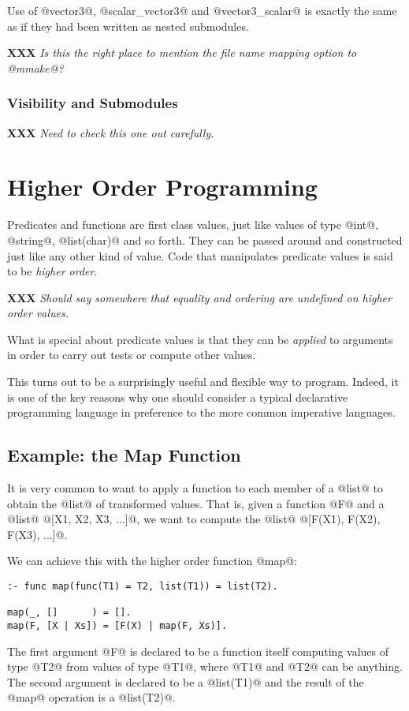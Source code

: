 \documentclass[a4paper,11pt,notitlepage,onecolumn]{article}
\newcommand{\XXX}[1]%
{{\small\textbf{XXX} \emph{#1}}}
\begin{document}
Use of @vector3@, @scalar_vector3@ and @vector3_scalar@ is exactly the
same as if they had been written as nested submodules.

\XXX{Is this the right place to mention the file name mapping option to
@mmake@?}

\subsubsection{Visibility and Submodules}

\XXX{Need to check this one out carefully.}



\section{Higher Order Programming}

Predicates and functions are first class values, just like values of
type @int@, @string@, @list(char)@ and so forth.  They can be
passed around and constructed just like any other kind of value.  Code
that manipulates predicate values is said to be \emph{higher order}.

\XXX{Should say somewhere that equality and ordering are undefined on
higher order values.}

What is special about predicate values is that they can be
\emph{applied} to arguments in order to carry out tests or compute other
values.

This turns out to be a surprisingly useful and flexible way to program.
Indeed, it is one of the key reasons why one should consider a typical
declarative programming language in preference to the more common
imperative languages.

\subsection{Example: the Map Function}

It is very common to want to apply a function to each member of a @list@
to obtain the @list@ of transformed values.  That is, given a function
@F@ and a @list@ @[X1, X2, X3, ...]@, we want to compute the @list@
@[F(X1), F(X2), F(X3), ...]@.

We can achieve this with the higher order function @map@:
\begin{verbatim}
:- func map(func(T1) = T2, list(T1)) = list(T2).

map(_, []      ) = [].
map(F, [X | Xs]) = [F(X) | map(F, Xs)].
\end{verbatim}
The first argument @F@ is declared to be a function itself computing
values of type @T2@ from values of type @T1@, where @T1@ and @T2@ can be
anything.  The second argument is declared to be a @list(T1)@ and the
result of the @map@ operation is a @list(T2)@.
\end{document}
